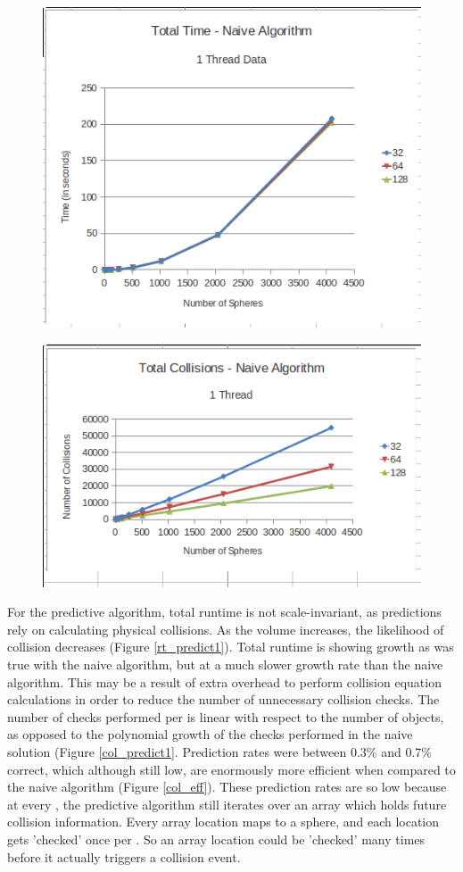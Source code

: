 \documentclass[CEJCS,PDF]{cej} %
\begin{document}
\begin{center}
\begin{figure}
	\includegraphics[width=.45\textwidth]{runtime_naive_1thread.png}
	\label{rt_naive1}
\end{figure}
\end{center}

\begin{center}
\begin{figure}
	\includegraphics[width=.45\textwidth]{collisions_naive_1thread.png}
	\label{col_naive1}
\end{figure}
\end{center}

For the predictive algorithm, total runtime is not scale-invariant, as predictions rely on calculating physical collisions.  As the volume increases, the likelihood of collision decreases (Figure \ref{rt_predict1}).  Total runtime is showing growth as was true with the naive algorithm, but at a much slower growth rate than the naive algorithm.  This may be a result of extra overhead to perform collision equation calculations in order to reduce the number of unnecessary collision checks.  The number of checks performed per  is linear with respect to the number of objects, as opposed to the polynomial growth of the checks performed in the naive solution (Figure \ref{col_predict1}.  Prediction rates were between 0.3\% and 0.7\% correct, which although still low, are enormously more efficient when compared to the naive algorithm (Figure \ref{col_eff}).  These prediction rates are so low because at every , the predictive algorithm still iterates over an array which holds future collision information.  Every array location maps to a sphere, and each location gets 'checked' once per .  So an array location could be 'checked' many times before it actually triggers a collision event.
\end{document}
